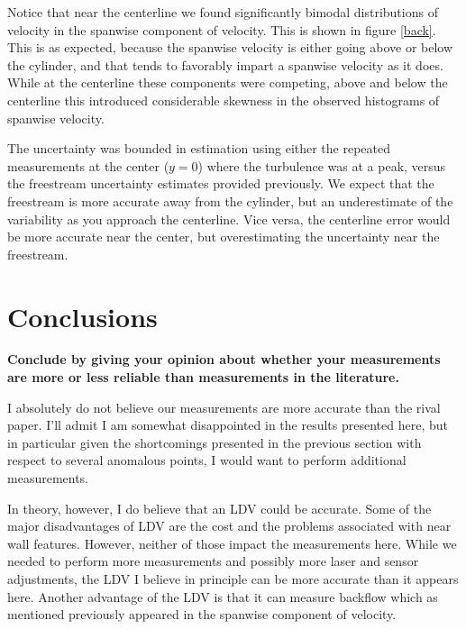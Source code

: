 \documentclass{article}
\begin{document}
Notice that near the centerline we found significantly bimodal
distributions of velocity in the spanwise component of velocity. This is
shown in figure \ref{back}. This is as expected, because the spanwise
velocity is either going above or below the cylinder, and that tends to
favorably impart a spanwise velocity as it does. While at the centerline
these components were competing, above and below the centerline this
introduced considerable skewness in the observed histograms of spanwise
velocity. 

The uncertainty was bounded in estimation using either the repeated
measurements at the center ($y=0$) where the turbulence was at a peak,
versus the freestream uncertainty estimates provided previously. We
expect that the freestream is more accurate away from the cylinder, but
an underestimate of the variability as you approach the centerline. Vice
versa, the centerline error would be more accurate near the center, but
overestimating the uncertainty near the freestream. 

\section{Conclusions}

\textbf{Conclude by giving your opinion about whether your measurements
are more or less reliable than measurements in the literature.} 

I absolutely do not believe our measurements are more accurate than the
rival paper. I'll admit I am somewhat disappointed in the results
presented here, but in particular given the shortcomings presented in
the previous section with respect to several anomalous points, I would
want to perform additional measurements. 

In theory, however, I do believe that an LDV could be accurate. Some of
the major disadvantages of LDV are the cost and the problems associated
with near wall features. However, neither of those impact the
measurements here. While we needed to perform more measurements and
possibly more laser and sensor adjustments, the LDV I believe in
principle can be more accurate than it appears here. Another
advantage of the LDV is that it can measure backflow which as mentioned
previously appeared in the spanwise component of velocity. 



%
%
%
\end{document}
